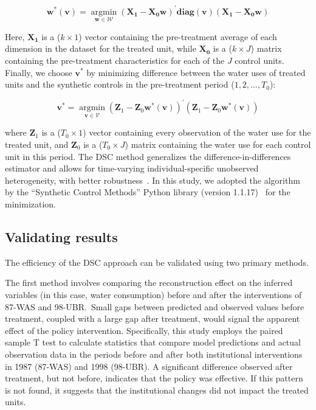 \documentclass[preprint, 12pt]{elsarticle}
\begin{document}
\begin{equation}
    \mathbf{w^{*}(v)}=\underset{\mathbf{w} \in \mathcal{W}}{\operatorname{argmin}}\left(\mathbf{X}_{\mathbf{1}}-\mathbf{X}_{\mathbf{0}} \mathbf{w}\right)^{\prime} \mathbf{diag(v)}\left(\mathbf{X}_{\mathbf{1}}-\mathbf{X}_{\mathbf{0}} \mathbf{w}\right)
\end{equation}

Here, $\mathbf{X_1}$ is a ($k \times 1$) vector containing the pre-treatment average of each dimension in the dataset for the treated unit, while $\mathbf{X_0}$ is a ($k \times J$) matrix containing the pre-treatment characteristics for each of the $J$ control units.
Finally, we choose $\mathbf{v^{*}}$ by minimizing difference between the water uses of treated units and the synthetic controls in the pre-treatment period ($1, 2, \dots, T_0$):

\begin{equation}
\mathbf{v}^{*}=\underset{\mathbf{v} \in \mathcal{V}}{\operatorname{argmin}}\left(\mathbf{Z}_{1}-\mathbf{Z}_{0} \mathbf{w}^{*}(\mathbf{v})\right)^{\prime}\left(\mathbf{Z}_{1}-\mathbf{Z}_{0} \mathbf{w}^{*}(\mathbf{v})\right)
\end{equation}

where $\mathbf{Z}_{1}$ is a ($T_0 \times 1$) vector containing every observation of the water use for the treated unit, and $\mathbf{Z}_{0}$ is a ($T_0 \times J$) matrix containing the water use for each control unit in this period.
The DSC method generalizes the difference-in-differences estimator and allows for time-varying individual-specific unobserved heterogeneity, with better robustness~\cite{billmeier2013, smith2015}.
In this study, we adopted the algorithm by the ``Synthetic Control Methods'' Python library (version 1.1.17)~\cite{engelbrektson2023} for the minimization.

\subsection{Validating results}\label{sec:robustness}

The efficiency of the DSC approach can be validated using two primary methods.

The first method involves comparing the reconstruction effect on the inferred variables (in this case, water consumption) before and after the interventions of 87-WAS and 98-UBR.\
Small gaps between predicted and observed values before treatment, coupled with a large gap after treatment, would signal the apparent effect of the policy intervention.
Specifically, this study employs the paired sample T test to calculate statistics that compare model predictions and actual observation data in the periods before and after both institutional interventions in 1987 (87-WAS) and 1998 (98-UBR).
A significant difference observed after treatment, but not before, indicates that the policy was effective.
If this pattern is not found, it suggests that the institutional changes did not impact the treated units.
\end{document}

